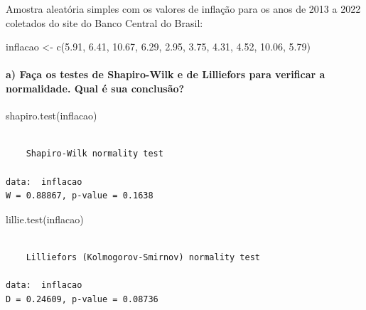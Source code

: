 \documentclass[
  letterpaper,
  DIV=11,
  numbers=noendperiod]{scrartcl}
\let\oldparagraph\paragraph
\renewcommand{\paragraph}[1]{\oldparagraph{#1}\mbox{}}
\newenvironment{Shaded}{\begin{snugshade}}{\end{snugshade}}
\newcommand{\FloatTok}[1]{\textcolor[rgb]{0.68,0.00,0.00}{#1}}
\newcommand{\FunctionTok}[1]{\textcolor[rgb]{0.28,0.35,0.67}{#1}}
\newcommand{\NormalTok}[1]{\textcolor[rgb]{0.00,0.23,0.31}{#1}}
\newcommand{\OtherTok}[1]{\textcolor[rgb]{0.00,0.23,0.31}{#1}}
\begin{document}
Amostra aleatória simples com os valores de inflação para os anos de
2013 a 2022 coletados do site do Banco Central do Brasil:

\begin{Shaded}
\begin{Highlighting}[]
\NormalTok{inflacao }\OtherTok{\textless{}{-}} \FunctionTok{c}\NormalTok{(}\FloatTok{5.91}\NormalTok{, }\FloatTok{6.41}\NormalTok{, }\FloatTok{10.67}\NormalTok{, }\FloatTok{6.29}\NormalTok{, }\FloatTok{2.95}\NormalTok{, }\FloatTok{3.75}\NormalTok{, }\FloatTok{4.31}\NormalTok{, }\FloatTok{4.52}\NormalTok{, }\FloatTok{10.06}\NormalTok{, }\FloatTok{5.79}\NormalTok{)}
\end{Highlighting}
\end{Shaded}

\hypertarget{a-fauxe7a-os-testes-de-shapiro-wilk-e-de-lilliefors-para-verificar-a-normalidade.-qual-uxe9-sua-conclusuxe3o}{%
\paragraph{a) Faça os testes de Shapiro-Wilk e de Lilliefors para
verificar a normalidade. Qual é sua
conclusão?}\label{a-fauxe7a-os-testes-de-shapiro-wilk-e-de-lilliefors-para-verificar-a-normalidade.-qual-uxe9-sua-conclusuxe3o}}

\begin{Shaded}
\begin{Highlighting}[]
\FunctionTok{shapiro.test}\NormalTok{(inflacao)}
\end{Highlighting}
\end{Shaded}

\begin{verbatim}

    Shapiro-Wilk normality test

data:  inflacao
W = 0.88867, p-value = 0.1638
\end{verbatim}

\begin{Shaded}
\begin{Highlighting}[]
\FunctionTok{lillie.test}\NormalTok{(inflacao)}
\end{Highlighting}
\end{Shaded}

\begin{verbatim}

    Lilliefors (Kolmogorov-Smirnov) normality test

data:  inflacao
D = 0.24609, p-value = 0.08736
\end{verbatim}
\end{document}
